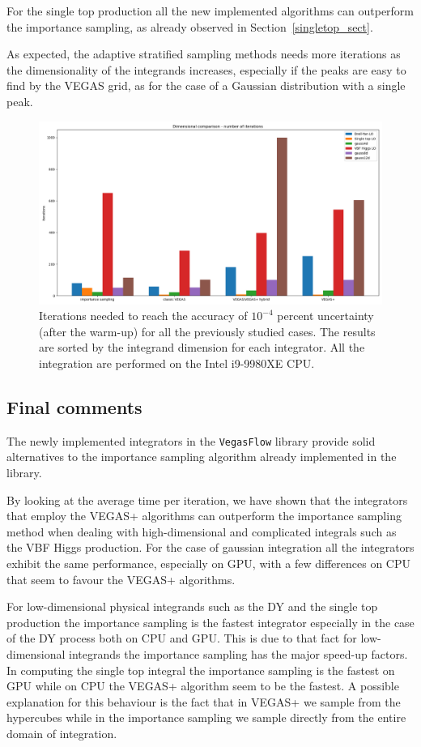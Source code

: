 \documentclass[../main/main.tex]{subfiles}
\begin{document}
For the single top production all the new implemented algorithms can outperform the importance sampling, as already observed in Section~\ref{singletop_sect}.

As expected, the adaptive stratified sampling methods needs more iterations as the dimensionality of the integrands increases, especially if the peaks are easy to find by the VEGAS grid, as for the case of a Gaussian distribution with a single peak.
\begin{figure}[h]
	\centering
	\includegraphics[width=\textwidth]{../images/iter_final.png}
	\caption{Iterations needed to reach the accuracy of $10^{-4}$ percent uncertainty (after the warm-up) for all the previously studied cases. The results are sorted by the integrand dimension for each integrator. All the integration are performed on the Intel i9-9980XE CPU. }
	\label{cpu_iter_comparison}
\end{figure}

\subsection{Final comments}
The newly implemented integrators in the \texttt{VegasFlow} library provide solid alternatives to the importance sampling algorithm already implemented in the library.

By looking at the average time per iteration, we have shown that the integrators that employ the VEGAS+ algorithms can outperform the importance sampling method when dealing with high-dimensional and complicated integrals such as the VBF Higgs production.
For the case of gaussian integration all the integrators exhibit the same performance, especially on GPU, with a few differences on CPU that seem to favour the VEGAS+ algorithms.

For low-dimensional physical integrands such as the DY and the single top production the importance sampling is the fastest integrator especially in the case of the DY process both on CPU and GPU. This is due to that fact for low-dimensional integrands the importance sampling has the major speed-up factors.
In computing the single top integral the importance sampling is the fastest on GPU while on CPU the VEGAS+ algorithm seem to be the fastest. A possible explanation for this behaviour is the fact that in VEGAS+ we sample from the hypercubes while in the importance sampling we sample directly from the entire domain of integration.
\end{document}
